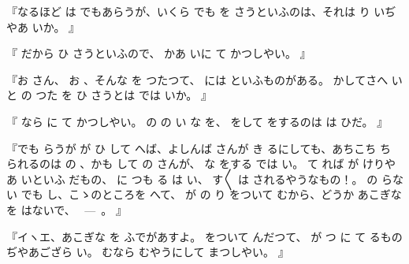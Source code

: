 『なるほど
は
でもあらうが、いくら
でも
を
さうといふのは、それは
り
いぢやあ
いか。
』

『
だから
ひ
さうといふので、
かあ
いに
て
かつしやい。
』

『お
さん、
お
、そんな
を
つたつて、
には
といふものがある。
かしてさへ
いと
の
つた
を
ひ
さうとは
では
いか。
』

『
なら
に
て
かつしやい。
の
の
い
な
を、
をして
をするのは
は
ひだ。
』

『でも
らうが
が
ひ
して
へば、よしんば
さんが
き
るにしても、あちこち
ち
られるのは
の
、かも
して
の
さんが、
な
をする
では
い。
て
れば
が
けりやあ
いといふ
だもの、
に
つも
る
は
い、
す〳〵
は
されるやうなもの！。
の
らない
でも
し、こゝのところを
へて、
が
の
り
をついて
むから、どうか
あこぎな
を
はないで、
\ ---\ 。
』

『イヽエ、あこぎな
を
ふでがあすよ。
をついて
んだつて、
が
つ
に
て
るものぢやあござら
い。
むなら
むやうにして
まつしやい。
』

